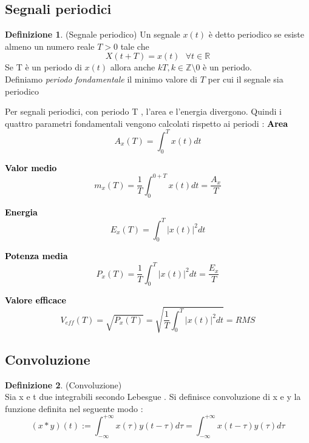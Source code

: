 \documentclass{article}
\theoremstyle{definition}
\newtheorem*{definizione}{Definizione}
\newcommand{\R}{\mathbb{R}}
\newcommand{\intinf}{\int_{-\infty}^{+\infty}}
\begin{document}
\subsection{Segnali periodici}
\begin{definizione}(Segnale periodico)\newline
	Un segnale $x(t)$ è detto periodico se esiste almeno un numero reale $T>0$ tale che 
	$$X(t+T)=x(t) \ \ \ \forall t \in \R$$
	Se T è un periodo di $x(t)$ allora anche $kT , k \in \mathbb{Z}\setminus 0 $ è un periodo. \\Definiamo \textit{periodo fondamentale} il minimo valore di $T$ per cui il segnale sia periodico
\end{definizione}
Per segnali periodici,  con periodo T ,  l'area e l'energia divergono. Quindi i quattro parametri fondamentali vengono calcolati rispetto ai periodi : \newpage
\textbf{\textcolor{black}{Area}}  
\[
A_x(T) = \int_{0}^{T} x(t) dt
\]

\textbf{\textcolor{black}{Valor medio }}  
\[
m_x(T) = \frac{1}{T} \int_{0}^{0+T} x(t) dt = \frac{A_x}{T}
\]

\textbf{\textcolor{black}{Energia}}  
\[
E_x(T) = \int_{0}^{T} |x(t)|^2 dt
\]

\textbf{\textcolor{black}{Potenza media}}  
\[
P_x(T) = \frac{1}{T} \int_{0}^{T} |x(t)|^2 dt = \frac{E_x}{T}
\]

\textbf{\textcolor{black}{Valore efficace}}  
\[
V_{eff}(T) = \sqrt{P_x(T)} = \sqrt{\frac{1}{T} \int_{0}^{T} |x(t)|^2 dt} = RMS
\]
\subsection{Convoluzione}
\begin{definizione}(Convoluzione)\\
	Sia x e t due integrabili secondo Lebesgue . Si definisce convoluzione di x e y la funzione definita nel seguente modo : 
		$$(x *y)(t) :=\intinf x(\tau)y(t-\tau)d\tau =\intinf x(t-\tau) y(\tau)d\tau $$
\end{definizione}
\end{document}
